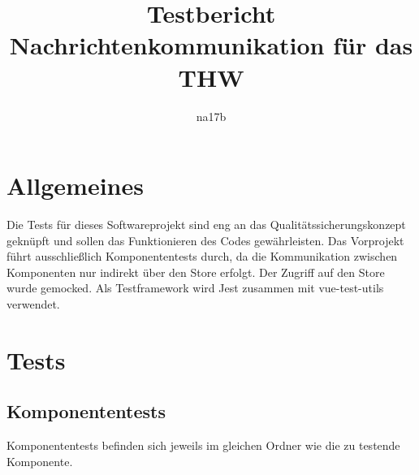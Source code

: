 \documentclass[a4paper,11pt,oneside, titlepage]{article}
\title{Testbericht\\Nachrichtenkommunikation für das THW}
\author{na17b}
\date{}
\begin{document}
\maketitle

\tableofcontents

\newpage

\section{Allgemeines}
Die Tests für dieses Softwareprojekt sind eng an das Qualitätssicherungskonzept geknüpft und sollen das Funktionieren des Codes gewährleisten. Das Vorprojekt führt ausschließlich Komponententests durch, da die Kommunikation zwischen Komponenten nur indirekt über den Store erfolgt. Der Zugriff auf den Store wurde
gemocked. Als Testframework wird \gls{Jest} zusammen mit \gls{vue-test-utils} verwendet.
\section{Tests}
\subsection{Komponententests}
Komponententests befinden sich jeweils im gleichen Ordner wie die zu testende Komponente.
\end{document}
